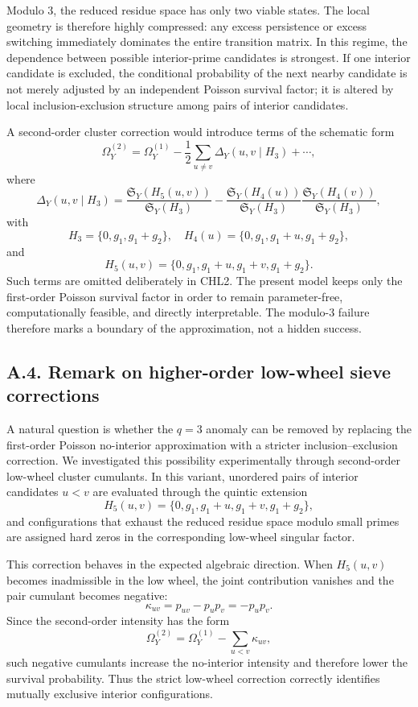\documentclass[10pt]{article}
\begin{document}
Modulo $3$, the reduced residue space has only two viable states.  The local geometry is therefore highly compressed: any excess persistence or excess switching immediately dominates the entire transition matrix.  In this regime, the dependence between possible interior-prime candidates is strongest.  If one interior candidate is excluded, the conditional probability of the next nearby candidate is not merely adjusted by an independent Poisson survival factor; it is altered by local inclusion-exclusion structure among pairs of interior candidates.

A second-order cluster correction would introduce terms of the schematic form
\[
\Omega_Y^{(2)}=\Omega_Y^{(1)}-\frac12\sum_{u\ne v}\Delta_Y(u,v\mid H_3)+\cdots,
\]
where
\[
\Delta_Y(u,v\mid H_3)=\frac{\mathfrak S_Y(H_5(u,v))}{\mathfrak S_Y(H_3)}-\frac{\mathfrak S_Y(H_4(u))}{\mathfrak S_Y(H_3)}\frac{\mathfrak S_Y(H_4(v))}{\mathfrak S_Y(H_3)},
\]
with
\[
H_3=\{0,g_1,g_1+g_2\},\quad
H_4(u)=\{0,g_1,g_1+u,g_1+g_2\},
\]
and
\[
H_5(u,v)=\{0,g_1,g_1+u,g_1+v,g_1+g_2\}.
\]
Such terms are omitted deliberately in CHL2.  The present model keeps only the first-order Poisson survival factor in order to remain parameter-free, computationally feasible, and directly interpretable.  The modulo-$3$ failure therefore marks a boundary of the approximation, not a hidden success.


\subsection*{A.4. Remark on higher-order low-wheel sieve corrections}

A natural question is whether the $q=3$ anomaly can be removed by replacing the first-order Poisson no-interior approximation with a stricter inclusion--exclusion correction. We investigated this possibility experimentally through second-order low-wheel cluster cumulants. In this variant, unordered pairs of interior candidates $u < v$ are evaluated through the quintic extension
\[
H_5(u,v)=\{0,g_1,g_1+u,g_1+v,g_1+g_2\},
\]
and configurations that exhaust the reduced residue space modulo small primes are assigned hard zeros in the corresponding low-wheel singular factor.

This correction behaves in the expected algebraic direction. When $H_5(u,v)$ becomes inadmissible in the low wheel, the joint contribution vanishes and the pair cumulant becomes negative:
\[
\kappa_{uv}=p_{uv}-p_up_v=-p_up_v.
\]
Since the second-order intensity has the form
\[
\Omega_Y^{(2)}=\Omega_Y^{(1)}-\sum_{u < v}\kappa_{uv},
\]
such negative cumulants increase the no-interior intensity and therefore lower the survival probability. Thus the strict low-wheel correction correctly identifies mutually exclusive interior configurations.
\end{document}
